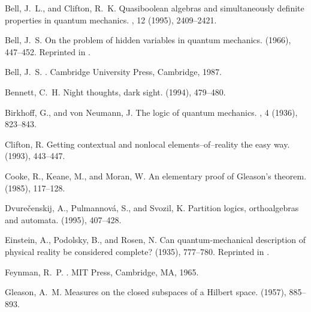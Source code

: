 \begin{thebibliography}{10}

{\sc Bell, J.~L., and Clifton, R.~K.}
\newblock Quasiboolean algebras and simultaneously definite properties in
  quantum mechanics.
, 12 (1995),
  2409--2421.

{\sc Bell, J.~S.}
\newblock On the problem of hidden variables in quantum mechanics.
 (1966), 447--452.
\newblock Reprinted in \cite[pp. 1-13]{bell-87}.

{\sc Bell, J.~S.}
.
\newblock Cambridge University Press, Cambridge, 1987.

{\sc Bennett, C.~H.}
\newblock Night thoughts, dark sight.
 (1994), 479--480.

{\sc Birkhoff, G., and von Neumann, J.}
\newblock The logic of quantum mechanics.
, 4 (1936), 823--843.

{\sc Clifton, R.}
\newblock Getting contextual and nonlocal elements--of--reality the easy way.
 (1993), 443--447.

{\sc Cooke, R., Keane, M., and Moran, W.}
\newblock An elementary proof of {G}leason's theorem.
 (1985), 117--128.

{\sc Dvure{\v{c}}enskij, A., Pulmannov{\'{a}}, S., and Svozil, K.}
\newblock Partition logics, orthoalgebras and automata.
 (1995), 407--428.

{\sc Einstein, A., Podolsky, B., and Rosen, N.}
\newblock Can quantum-mechanical description of physical reality be considered
  complete?
 (1935), 777--780.
\newblock Reprinted in \cite[pp. 138-141]{wheeler-Zurek:83}.

{\sc Feynman, R.~P.}
.
\newblock MIT Press, Cambridge, MA, 1965.

{\sc Gleason, A.~M.}
\newblock Measures on the closed subspaces of a {H}ilbert space.
 (1957), 885--893.


\end{thebibliography}
